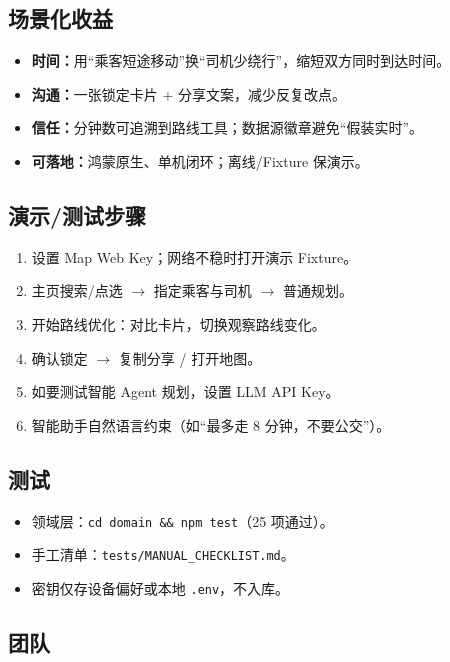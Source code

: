 \documentclass[UTF8,a4paper,zihao=-4]{ctexart}
\begin{document}
\subsection{场景化收益}

\begin{itemize}
  \item \textbf{时间：}用“乘客短途移动”换“司机少绕行”，缩短双方同时到达时间。
  \item \textbf{沟通：}一张锁定卡片 + 分享文案，减少反复改点。
  \item \textbf{信任：}分钟数可追溯到路线工具；数据源徽章避免“假装实时”。
  \item \textbf{可落地：}鸿蒙原生、单机闭环；离线/Fixture 保演示。
\end{itemize}

\subsection{演示/测试步骤}

\begin{enumerate}
  \item 设置 Map Web Key；网络不稳时打开演示 Fixture。
  \item 主页搜索/点选 $\rightarrow$ 指定乘客与司机 $\rightarrow$ 普通规划。
  \item 开始路线优化：对比卡片，切换观察路线变化。
  \item 确认锁定 $\rightarrow$ 复制分享 / 打开地图。
  \item 如要测试智能 Agent 规划，设置 LLM API Key。
  \item 智能助手自然语言约束（如“最多走 8 分钟，不要公交”）。
\end{enumerate}

\subsection{测试}

\begin{itemize}
  \item 领域层：\texttt{cd domain \&\& npm test}（25 项通过）。
  \item 手工清单：\texttt{tests/MANUAL\_CHECKLIST.md}。
  \item 密钥仅存设备偏好或本地 \texttt{.env}，不入库。
\end{itemize}

\subsection{团队}
\end{document}
